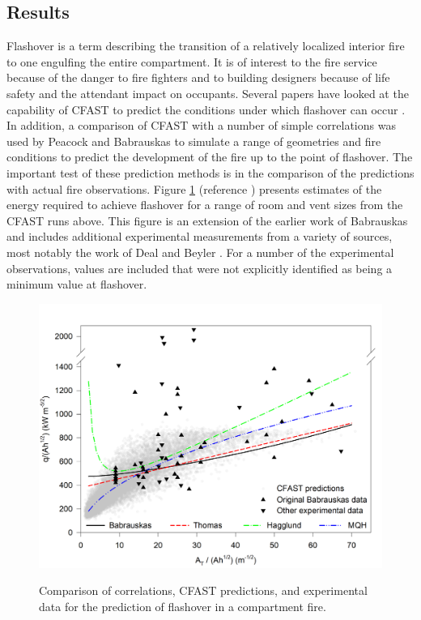 \documentclass[12pt,twoside]{book}
\begin{document}
\subsection{Results}

Flashover is a term describing the transition of a relatively localized interior fire to one engulfing the entire compartment. It is of interest to the fire service because of the danger to fire fighters and to building designers because of life safety and the attendant impact on occupants. Several papers have looked at the capability of CFAST to predict the conditions under which flashover can occur \cite{Valid:Chow_Flashover, Valid:Luo_Flashover, Valid:Collier, Valid:White}. In addition, a comparison of CFAST with a number of simple correlations was used by Peacock and Babrauskas \cite{Valid:Peacock_Flashover_1,Valid:Peacock_Flashover_2} to simulate a range of geometries and fire conditions to predict the development of the fire up to the point of flashover. The important test of  these prediction methods is in the comparison of the predictions with actual fire observations. Figure \ref{figValidFlashover} (reference \cite{Valid:Peacock_Flashover_2}) presents estimates of the energy required to achieve flashover for a range of room and vent sizes from the CFAST runs above. This figure is an extension of the earlier work of Babrauskas  \cite{Valid:Babrauskas_Flashover} and includes additional experimental measurements from a variety of sources, most notably the work of Deal and Beyler \cite{Valid:DealandBeyler}. For a number of the experimental observations, values are included that were not explicitly identified as being a minimum value at flashover.

\begin{figure}
\begin{center}
\includegraphics[width=6.0000in]{../Validation_Guide/FIGURES/flashover.pdf}\\
\end{center}
\caption{Comparison of correlations, CFAST predictions, and experimental data for the prediction of flashover in a compartment fire.}
 \label{figValidFlashover}
\end{figure}
\end{document}
